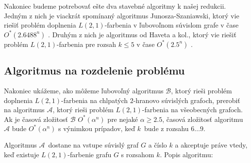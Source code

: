 Nakoniec budeme potrebovať ešte dva stavebné algoritmy k našej redukcii. Jedným z nich je
viackrát spomínaný algoritmus Junosza-Szaniawski, ktorý vie riešiť problém doplnenia $L(2,1)$-farbenia
v ľubovoľnom súvislom grafe v čase $O^*(2.6488^n)$ \cite{junosza_fast}. Druhým z nich je algoritmus od Haveta
a kol., ktorý vie riešiť problém $L(2,1)$-farbenia pre rozsah $k \leq 5$ v čase $O^*(2.5^n)$ \cite{havet}.

\subsection{Algoritmus na rozdelenie problému}

Nakoniec ukážeme, ako môžeme ľubovoľný algoritmus $\mathcal{B}$, ktorý rieši problém doplnenia
$L(2,1)$-farbenia na chlpatých $2$-hranovo súvislých grafoch, prerobiť na algoritmus $\mathcal{A}$, ktorý
rieši problém $L(2,1)$-farbenia na všeobecných grafoch. Ak je časová zložitosť $\mathcal{B}$
$O^*(\alpha^n)$ pre nejaké $\alpha \ge 2.5$, časová zložitosť algoritmu $\mathcal{A}$ bude $O^*(\alpha^n)$
s výnimkou prípadov, keď $k$ bude z rozsahu $6 \ldots 9$.

Algoritmus $\mathcal{A}$ dostane na vstupe súvislý graf $G$ a číslo $k$ a akceptuje práve vtedy,
keď existuje $L(2,1)$-farbenie grafu $G$ s rozsahom $k$. Popis algoritmu:

